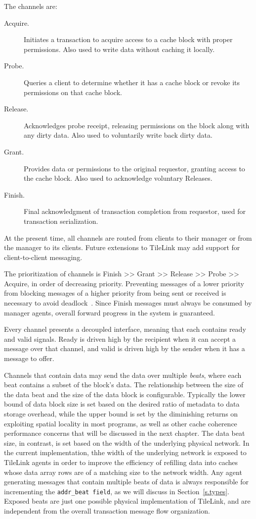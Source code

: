 The channels are:
\begin{description}
\item[Acquire.] Initiates a transaction to acquire access to a cache block with proper permissions. Also used to write data without caching it locally.
\item[Probe.] Queries a client to determine whether it has a cache block or revoke its permissions on that cache block.
\item[Release.] Acknowledges probe receipt, releasing permissions on the block along with any dirty data. Also used to voluntarily write back dirty data.
\item[Grant.] Provides data or permissions to the original requestor, granting access to the cache block. Also used to acknowledge voluntary Releases.
\item[Finish.] Final acknowledgment of transaction completion from requestor, used for transaction serialization.
\end{description}

At the present time, all channels are routed from clients to their manager or from the manager to its clients.
Future extensions to TileLink may add support for client-to-client messaging.

The prioritization of channels is Finish >> Grant >> Release >> Probe >> Acquire, in order of decreasing priority.
Preventing messages of a lower priority from blocking messages of a higher priority from being sent or received is necessary to avoid deadlock~\cite{sorin2011primer}.
Since Finish messages must always be consumed by manager agents, overall forward progress in the system is guaranteed.

Every channel presents a decoupled interface, meaning that each contains ready and valid signals.
Ready is driven high by the recipient when it can accept a message over that channel,
and valid is driven high by the sender when it has a message to offer.

Channels that contain data may send the data over multiple {\em beats}, where each beat contains a subset of the block's data.
The relationship between the size of the data beat and the size of the data block is configurable.
Typically the lower bound of data block size is set based on
the desired ratio of metadata to data storage overhead,
while the upper bound is set by the diminishing returns on exploiting spatial locality in most programs,
as well as other cache coherence performance concerns that will be discussed in the next chapter.
The data beat size, in contrast, is set based on the width of the underlying physical network.
In the current implementation, thhe width of the underlying network is exposed to TileLink agents in order to
improve the efficiency of refilling data into caches whose data array rows are of a matching size to the network width.
Any agent generating messages that contain multiple beats of data is always responsible for incrementing the {\tt addr\_beat field}, as we will discuss in Section~\ref{s.types}.
Exposed beats are just one possible physical implementation of TileLink, and are independent from the overall transaction message flow organization.

